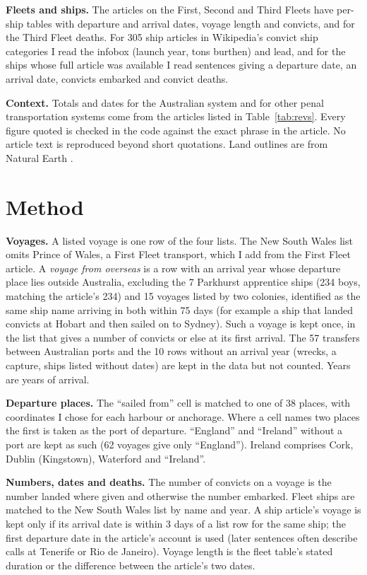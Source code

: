 \documentclass[11pt,a4paper]{article}
\begin{document}
\textbf{Fleets and ships.} The articles on the First, Second and Third Fleets have per-ship tables with departure and arrival dates, voyage length and convicts, and for the Third Fleet deaths. For 305 ship articles in Wikipedia's convict ship categories I read the infobox (launch year, tons burthen) and lead, and for the ships whose full article was available I read sentences giving a departure date, an arrival date, convicts embarked and convict deaths.

\textbf{Context.} Totals and dates for the Australian system and for other penal transportation systems come from the articles listed in Table~\ref{tab:revs}. Every figure quoted is checked in the code against the exact phrase in the article. No article text is reproduced beyond short quotations. Land outlines are from Natural Earth \citep{naturalearth}.

\section{Method}
\textbf{Voyages.} A listed voyage is one row of the four lists. The New South Wales list omits Prince of Wales, a First Fleet transport, which I add from the First Fleet article. A \emph{voyage from overseas} is a row with an arrival year whose departure place lies outside Australia, excluding the 7 Parkhurst apprentice ships (234 boys, matching the article's 234) and 15 voyages listed by two colonies, identified as the same ship name arriving in both within 75 days (for example a ship that landed convicts at Hobart and then sailed on to Sydney). Such a voyage is kept once, in the list that gives a number of convicts or else at its first arrival. The 57 transfers between Australian ports and the 10 rows without an arrival year (wrecks, a capture, ships listed without dates) are kept in the data but not counted. Years are years of arrival.

\textbf{Departure places.} The ``sailed from'' cell is matched to one of 38 places, with coordinates I chose for each harbour or anchorage. Where a cell names two places the first is taken as the port of departure. ``England'' and ``Ireland'' without a port are kept as such (62 voyages give only ``England''). Ireland comprises Cork, Dublin (Kingstown), Waterford and ``Ireland''.

\textbf{Numbers, dates and deaths.} The number of convicts on a voyage is the number landed where given and otherwise the number embarked. Fleet ships are matched to the New South Wales list by name and year. A ship article's voyage is kept only if its arrival date is within 3 days of a list row for the same ship; the first departure date in the article's account is used (later sentences often describe calls at Tenerife or Rio de Janeiro). Voyage length is the fleet table's stated duration or the difference between the article's two dates.
\end{document}
